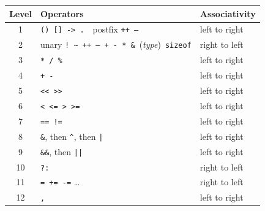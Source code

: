 \begin{center}
\renewcommand{\arraystretch}{1.25}
\begin{tabular}{c l l}
\toprule
\textbf{Level} & \textbf{Operators} & \textbf{Associativity} \\
\midrule
1 & \texttt{() [] -> .}\ \ postfix \texttt{++ --} & left to right \\
2 & unary \texttt{! \~{} ++ -- + - * \&}\ (\emph{type})\ \texttt{sizeof} & right to left \\
3 & \texttt{* / \%} & left to right \\
4 & \texttt{+ -} & left to right \\
5 & \texttt{<< >>} & left to right \\
6 & \texttt{< <= > >=} & left to right \\
7 & \texttt{== !=} & left to right \\
8 & \texttt{\&}, then \texttt{\^{}}, then \texttt{|} & left to right \\
9 & \texttt{\&\&}, then \texttt{||} & left to right \\
10 & \texttt{?:} & right to left \\
11 & \texttt{= += -=} \dots & right to left \\
12 & \texttt{,} & left to right \\
\bottomrule
\end{tabular}
\end{center}
